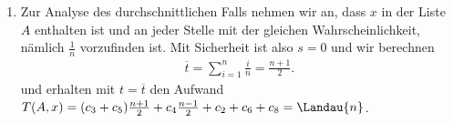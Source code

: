 \begin{solution}
\begin{enumerate}[label = (\arabic*)]
		\item Zur Analyse des durchschnittlichen Falls nehmen wir an, dass $x$ in der Liste $A$ enthalten ist und an jeder Stelle mit der gleichen Wahrscheinlichkeit, nämlich $\frac{1}{n}$ vorzufinden ist. Mit Sicherheit ist also $s = 0$ und wir berechnen
		\begin{align*}
		\overline{t} = \sum_{i=1}^n \frac{i}{n} = \frac{n+1}{2}.
		\end{align*}
		und erhalten mit $t = \overline{t}$ den Aufwand $T(A,x) = (c_3 + c_5) \frac{n + 1}{2} + c_4 \frac{n - 1}{2} + c_2 + c_6 + c_8 = \Landau{n}$.
	\end{enumerate}
\end{solution}
